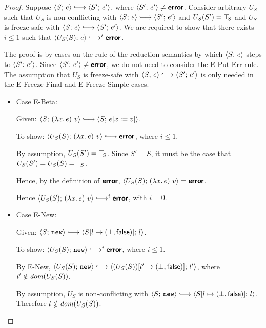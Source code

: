 \begin{proof}
  Suppose $\config{S}{e} \parstepsto \config{S'}{e'}$, where
  $\langle S';\, e' \rangle \neq \textbf{\textsf{error}}$. Consider arbitrary $U_S$ such that
  $U_S$ is non-conflicting with $\config{S}{e} \parstepsto
  \config{S'}{e'}$ and $U_S(S') = \top\hspace{-0.85mm}_{S}$ and $U_S$ is freeze-safe with
  $\config{S}{e} \parstepsto \config{S'}{e'}$.  We are required to
  show that there exists $i \leq 1$ such that $\config{U_S(S)}{e}
  \parstepsto^i \error$.

  The proof is by cases on the rule of the reduction semantics by
  which $\langle S;\, e \rangle$ steps to $\langle S';\, e' \rangle$.  Since
  $\langle S';\, e' \rangle \neq \textbf{\textsf{error}}$, we do not need to consider the {\sc
    E-Put-Err} rule.  The assumption that $U_S$ is freeze-safe with
  $\config{S}{e} \parstepsto \config{S'}{e'}$ is only needed in the
  {\sc E-Freeze-Final} and {\sc E-Freeze-Simple} cases.

  \begin{itemize}

  \item Case {\sc E-Beta}:

    Given: $\config{S}{\app{(\lam{x}{e})}{v}} \parstepsto
    \config{S}{\subst{e}{x}{v}}$.

    To show: $\config{U_S(S)}{\app{(\lam{x}{e})}{v}} \parstepsto
    \error$, where $i \leq 1$.

    By assumption, $U_S(S') = \top\hspace{-0.85mm}_{S}$.  Since $S' = S$, it must be the
    case that $U_S(S') = U_S(S) = \top\hspace{-0.85mm}_{S}$.

    Hence, by the definition of $\textbf{\textsf{error}}$,
    $\langle U_S(S);\, (\lambda x.\,e)~v \rangle = \textbf{\textsf{error}}$.

    Hence $\config{U_S(S)}{\app{(\lam{x}{e})}{v}} \parstepsto^i
    \error$, with $i = 0$.

  \item Case {\sc E-New}:

    Given: $\config{S}{\NEW} \parstepsto
    \config{\extS{S}{l}{\bot}{\frozenfalse}}{l}$.

    To show: $\config{U_S(S)}{\NEW} \parstepsto^i \error$, where $i
    \leq 1$.

    By {\sc E-New}, $\config{U_S(S)}{\NEW} \parstepsto
    \config{\extS{(U_S(S))}{l'}{\bot}{\frozenfalse}}{l'}$, where $l'
    \notin \mathit{dom}(U_S(S))$.

    By assumption, $U_S$ is non-conflicting with $\config{S}{\NEW}
    \parstepsto \config{\extS{S}{l}{\bot}{\frozenfalse}}{l}$.
    Therefore $l \notin \mathit{dom}(U_S(S))$.


\end{itemize}
\end{proof}
